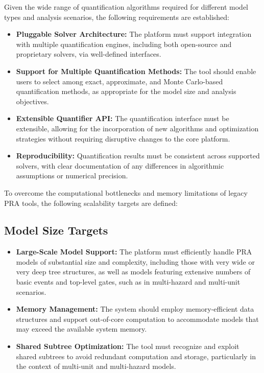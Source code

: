 Given the wide range of quantification algorithms required for different model types and analysis scenarios, the following requirements are established:

\begin{itemize}
    \item \textbf{Pluggable Solver Architecture:} The platform must support integration with multiple quantification engines, including both open-source and proprietary solvers, via well-defined interfaces.
    \item \textbf{Support for Multiple Quantification Methods:} The tool should enable users to select among exact, approximate, and Monte Carlo-based quantification methods, as appropriate for the model size and analysis objectives.
    \item \textbf{Extensible Quantifier API:} The quantification interface must be extensible, allowing for the incorporation of new algorithms and optimization strategies without requiring disruptive changes to the core platform.
    \item \textbf{Reproducibility:} Quantification results must be consistent across supported solvers, with clear documentation of any differences in algorithmic assumptions or numerical precision.
\end{itemize}

To overcome the computational bottlenecks and memory limitations of legacy PRA tools, the following scalability targets are defined:

\subsection{Model Size Targets}
\label{subsec:model-size-targets}

\begin{itemize}
    \item \textbf{Large-Scale Model Support:} The platform must efficiently handle PRA models of substantial size and complexity, including those with very wide or very deep tree structures, as well as models featuring extensive numbers of basic events and top-level gates, such as in multi-hazard and multi-unit scenarios.
    \item \textbf{Memory Management:} The system should employ memory-efficient data structures and support out-of-core computation to accommodate models that may exceed the available system memory.
    \item \textbf{Shared Subtree Optimization:} The tool must recognize and exploit shared subtrees to avoid redundant computation and storage, particularly in the context of multi-unit and multi-hazard models.
\end{itemize}

